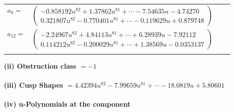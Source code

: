\documentclass[1p]{elsarticle_modified}
\theoremstyle{definition}
\begin{document}
\begin{tabular}{m{7pt} m{180pt} m{7pt} m{180pt} }
\flushright $a_{8}=$&$\begin{pmatrix}-0.858192 u^{82}+1.37862 u^{81}+\cdots-7.54635 u-4.74270\\0.321807 u^{82}-0.770401 u^{81}+\cdots-0.119629 u+0.879748\end{pmatrix}$ \\
\flushright $a_{12}=$&$\begin{pmatrix}-2.24967 u^{82}+4.84113 u^{81}+\cdots+6.28939 u-7.92112\\0.114212 u^{82}-0.200029 u^{81}+\cdots+1.38569 u-0.0353137\end{pmatrix}$\\&\end{tabular}
\flushleft \textbf{(ii) Obstruction class $= -1$}\\~\\
\flushleft \textbf{(iii) Cusp Shapes $= 4.42394 u^{82}-7.99659 u^{81}+\cdots-18.0819 u+5.80601$}\\~\\
\newpage\renewcommand{\arraystretch}{1}
\flushleft \textbf{(iv) u-Polynomials at the component}\newline \\
\end{document}
